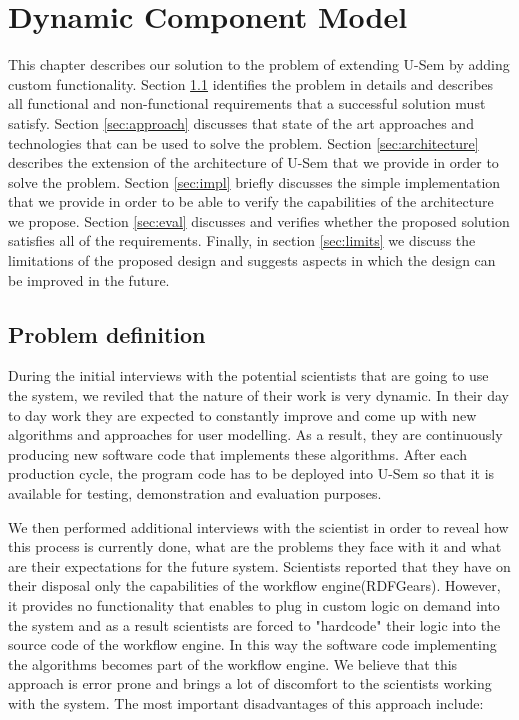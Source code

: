 
\chapter{Dynamic Component Model}

This chapter describes our solution to the problem of extending U-Sem by adding custom functionality. Section \ref{sec:problemDef} identifies the problem in details and describes all functional and non-functional requirements that a successful solution must satisfy. Section \ref{sec:approach} discusses that state of the art approaches and technologies that  can be used to solve the problem. Section \ref{sec:architecture} describes the extension of the architecture of U-Sem that we provide in order to solve the problem. Section \ref{sec:impl} briefly discusses the simple implementation that we provide in order to be able to verify the capabilities of the architecture we propose. Section \ref{sec:eval} discusses and verifies whether the proposed solution satisfies all of the requirements. Finally, in section \ref{sec:limits} we discuss the limitations of the proposed design and suggests aspects in which the design can be improved in the future.


\section{Problem definition}
\label{sec:problemDef}

During the initial interviews with the potential scientists that are going to use the system, we reviled that the nature of their work is very dynamic. In their day to day work they are expected to constantly improve and come up with new algorithms and approaches for user modelling. As a result, they are continuously producing new software code that implements these algorithms. After each production cycle, the program code has to be deployed into U-Sem so that it is available for testing, demonstration and evaluation purposes.

We then performed additional interviews with the scientist in order to reveal how this process is currently done, what are the problems they face with it and what are their expectations for the future system. Scientists reported that they have on their disposal only the capabilities of the workflow engine(RDFGears). However, it provides no functionality that enables to plug in custom logic on demand into the system and as a result scientists are forced to "hardcode" their logic into the source code of the workflow engine. In this way the software code implementing the algorithms becomes part of the workflow engine. We believe that this approach is error prone and brings a lot of discomfort to the scientists working with the system. The most important disadvantages of this approach include:

